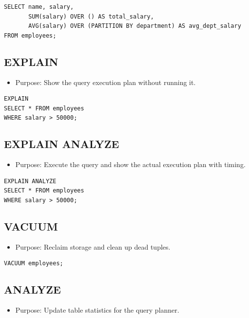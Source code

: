 \documentclass[10pt]{article}
\begin{document}
\begin{verbatim}
SELECT name, salary,
       SUM(salary) OVER () AS total_salary,
       AVG(salary) OVER (PARTITION BY department) AS avg_dept_salary
FROM employees;
\end{verbatim}

\subsection{EXPLAIN}
\begin{itemize}
    \item Purpose: Show the query execution plan without running it.
\end{itemize}

\begin{verbatim}
EXPLAIN
SELECT * FROM employees
WHERE salary > 50000;
\end{verbatim}

\subsection{EXPLAIN ANALYZE}
\begin{itemize}
    \item Purpose: Execute the query and show the actual execution plan with timing.
\end{itemize}

\begin{verbatim}
EXPLAIN ANALYZE
SELECT * FROM employees
WHERE salary > 50000;
\end{verbatim}

\subsection{VACUUM}
\begin{itemize}
    \item Purpose: Reclaim storage and clean up dead tuples.
\end{itemize}

\begin{verbatim}
VACUUM employees;
\end{verbatim}

\subsection{ANALYZE}
\begin{itemize}
    \item Purpose: Update table statistics for the query planner.
\end{itemize}
\end{document}
